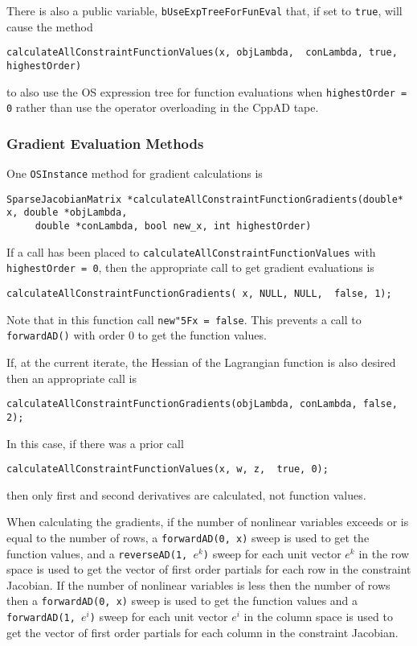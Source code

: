 \documentclass[11pt]{article}
\renewcommand{\_}{{\char"5F}}
\renewcommand{\{}{{\char"7B}}
\renewcommand{\}}{{\char"7D}}
\renewcommand{\^}{{\char"0D}}
\renewcommand{\'}{{\char"0D}}
\begin{document}
There is also a public variable, {\tt bUseExpTreeForFunEval} that, if set to {\tt true}, will cause the method
\begin{verbatim}
calculateAllConstraintFunctionValues(x, objLambda,  conLambda, true, highestOrder)
\end{verbatim}
to also use the OS expression tree for function evaluations when {\tt highestOrder = 0} rather than use the operator overloading in the CppAD tape.

\subsubsection{Gradient Evaluation Methods}

One {\tt OSInstance} method for gradient calculations is
\begin{verbatim}
SparseJacobianMatrix *calculateAllConstraintFunctionGradients(double* x, double *objLambda,
     double *conLambda, bool new_x, int highestOrder)
\end{verbatim}
If a call has been placed to {\tt calculateAllConstraintFunctionValues} with {\tt highestOrder = 0}, then the appropriate call to get gradient evaluations is
\begin{verbatim}
calculateAllConstraintFunctionGradients( x, NULL, NULL,  false, 1);
\end{verbatim}
Note that in this function call {\tt new\_x = false}. This prevents a call to {\tt forwardAD()} with order 0 to get the function values.


If, at the current iterate, the Hessian of the Lagrangian function is also desired then an appropriate call is
\begin{verbatim}
calculateAllConstraintFunctionGradients(objLambda, conLambda, false, 2);
\end{verbatim}
In this case, if there was a prior call
\begin{verbatim}
calculateAllConstraintFunctionValues(x, w, z,  true, 0);
\end{verbatim}
then only first and second derivatives are calculated, not function values.

When calculating the gradients, if the number of nonlinear variables exceeds or is equal  to the number of rows,  a {\tt forwardAD(0, x)} sweep is used to get the function values,  and   a {\tt reverseAD(1, $e^{k}$)}  sweep for each unit vector  $e^{k}$ in the row space  is used to get the vector of first order partials for each row in the constraint Jacobian.  If the number of nonlinear variables is less then the number of rows then a {\tt forwardAD(0, x)} sweep  is used to get the function values and a {\tt forwardAD(1,  $e^{i}$)}  sweep for each unit vector  $e^{i}$ in the column space is used to get the vector of first order partials for each column in the constraint Jacobian.
\end{document}
